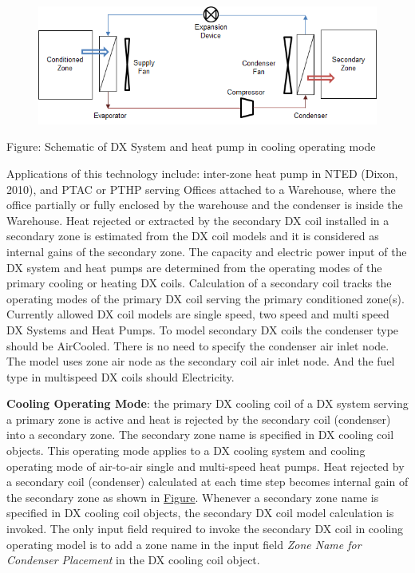 \begin{figure}[htbp]
\centering
\includegraphics{media/image903.png}
\caption{}
\end{figure}

Figure: Schematic of DX System and heat pump in cooling operating mode

Applications of this technology include: inter-zone heat pump in NTED (Dixon, 2010), and PTAC or PTHP serving Offices attached to a Warehouse, where the office partially or fully enclosed by the warehouse and the condenser is inside the Warehouse. Heat rejected or extracted by the secondary DX coil installed in a secondary zone is estimated from the DX coil models and it is considered as internal gains of the secondary zone. The capacity and electric power input of the DX system and heat pumps are determined from the operating modes of the primary cooling or heating DX coils. Calculation of a secondary coil tracks the operating modes of the primary DX coil serving the primary conditioned zone(s). Currently allowed DX coil models are single speed, two speed and multi speed DX Systems and Heat Pumps. To model secondary DX coils the condenser type should be AirCooled. There is no need to specify the condenser air inlet node. The model uses zone air node as the secondary coil air inlet node. And the fuel type in multispeed DX coils should Electricity.

\textbf{Cooling Operating Mode}: the primary DX cooling coil of a DX system serving a primary zone is active and heat is rejected by the secondary coil (condenser) into a secondary zone. The secondary zone name is specified in DX cooling coil objects. This operating mode applies to a DX cooling system and cooling operating mode of air-to-air single and multi-speed heat pumps. Heat rejected by a secondary coil (condenser) calculated at each time step becomes internal gain of the secondary zone as shown in \protect\hyperlink{SecondaryCoilsFigure2}{Figure}. Whenever a secondary zone name is specified in DX cooling coil objects, the secondary DX coil model calculation is invoked. The only input field required to invoke the secondary DX coil in cooling operating model is to add a zone name in the input field \emph{Zone Name for Condenser Placement} in the DX cooling coil object.

